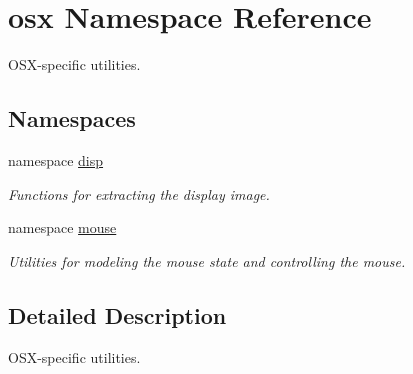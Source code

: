 \hypertarget{namespaceosx}{\section{osx Namespace Reference}
\label{namespaceosx}
}


O\-S\-X-\/specific utilities.  


\subsection*{Namespaces}
\begin{DoxyCompactItemize}
\item 
namespace \hyperlink{namespaceosx_1_1disp}{disp}
\begin{DoxyCompactList}\small\item\em Functions for extracting the display image. \end{DoxyCompactList}\item 
namespace \hyperlink{namespaceosx_1_1mouse}{mouse}
\begin{DoxyCompactList}\small\item\em Utilities for modeling the mouse state and controlling the mouse. \end{DoxyCompactList}\end{DoxyCompactItemize}


\subsection{Detailed Description}
O\-S\-X-\/specific utilities. 